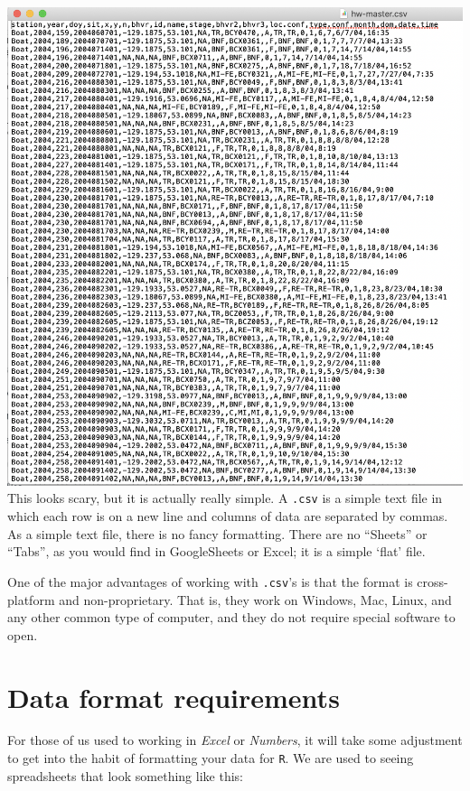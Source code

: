 \documentclass[
]{book}
\begin{document}
\includegraphics{img/csv_text_editor.png}
This looks scary, but it is actually really simple. A \texttt{.csv} is a simple text file in which each row is on a new line and columns of data are separated by commas. As a simple text file, there is no fancy formatting. There are no ``Sheets'' or ``Tabs'', as you would find in GoogleSheets or Excel; it is a simple `flat' file.

One of the major advantages of working with \texttt{.csv}'s is that the format is cross-platform and non-proprietary. That is, they work on Windows, Mac, Linux, and any other common type of computer, and they do not require special software to open.

\hypertarget{data-format-requirements}{%
\section*{Data format requirements}\label{data-format-requirements}}

For those of us used to working in \emph{Excel} or \emph{Numbers}, it will take some adjustment to get into the habit of formatting your data for \texttt{R}. We are used to seeing spreadsheets that look something like this:
\end{document}
